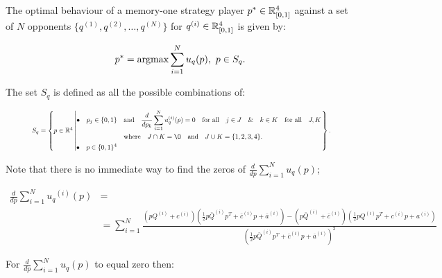 \begin{theorem}\label{theorem:memone_group_best_response}

    The optimal behaviour of a memory-one strategy player
    \(p^* \in \mathbb{R}_{[0, 1]} ^ 4\)
    against a set of \(N\) opponents \(\{q^{(1)}, q^{(2)}, \dots, q^{(N)} \}\)
    for \(q^{(i)} \in \mathbb{R}_{[0, 1]} ^ 4\) is given by:

    \[p^* = \textnormal{argmax}\sum\limits_{i=1} ^ N  u_q(p), \ p \in S_q.\]

    The set \(S_q\) is defined as all the possible combinations of:

    \begin{equation}\label{eq:s_q_set}
        \resizebox{.9\linewidth}{!}{ $
        S_q =
        \left\{p \in \mathbb{R} ^ 4 \left|
            \begin{aligned}
                \bullet\quad p_j \in \{0, 1\} & \quad \text{and} \quad \frac{d}{dp_k} 
                \sum\limits_{i=1} ^ N  u_q^{(i)}(p) = 0
                \quad \text{for all} \quad j \in J \quad \&  \quad k \in K  \quad \text{for all} \quad J, K \\
                & \quad \text{where} \quad J \cap K = \O \quad
                \text{and} \quad J \cup K = \{1, 2, 3, 4\}.\\
                \bullet\quad  p \in \{0, 1\} ^ 4
            \end{aligned}\right.
        \right\}.
        $}
    \end{equation}
\end{theorem}



Note that there is no immediate way to find the zeros of \(\frac{d}{dp} \sum\limits_{i=1} ^ N  u_q(p)\);

{\small
\begin{align}\label{eq:mo_tournament_derivative}
    \frac{d}{dp} \sum\limits_{i=1} ^ {N} {u_q}^{(i)} (p) & = \nonumber \\
    & =  \displaystyle\sum\limits_{i=1} ^ {N}
    \frac{\left(pQ^{(i)} + c^{(i)}\right) \left(\frac{1}{2} p\bar{Q}^{(i)} p^T + \bar{c}^{(i)} p + \bar{a}^ {(i)}\right)
    - \left(p\bar{Q}^{(i)} + \bar{c}^{(i)}\right) \left(\frac{1}{2} pQ^{(i)} p^T + c^{(i)} p + a^ {(i)}\right)}
    {\left(\frac{1}{2} p\bar{Q}^{(i)} p^T + \bar{c}^{(i)} p + \bar{a}^ {(i)}\right)^ 2}
\end{align}
}

For \(\frac{d}{dp} \sum\limits_{i=1} ^ N  u_q(p)\) to equal zero then:

